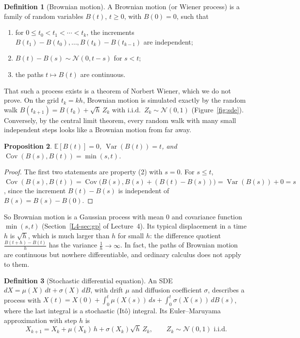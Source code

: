 \documentclass[11pt]{article}
\newcommand{\E}{\mathbb{E}}
\DeclareMathOperator{\Var}{Var}
\DeclareMathOperator{\Cov}{Cov}
\theoremstyle{definition}
\newtheorem{definition}{Definition}[section]
\theoremstyle{plain}
\newtheorem{proposition}[definition]{Proposition}
\theoremstyle{remark}
\begin{document}
\begin{definition}[Brownian motion]\label{def:brownian}
    A Brownian motion (or Wiener process) is a family of random variables $B(t)$, $t \geq 0$, with $B(0) = 0$, such that
    \begin{enumerate}
        \item for $0 \leq t_0 < t_1 < \cdots < t_k$, the increments $B(t_1) - B(t_0), \ldots, B(t_k) - B(t_{k-1})$ are independent;
        \item $B(t) - B(s) \sim \mathcal{N}(0, t - s)$ for $s < t$;
        \item the paths $t \mapsto B(t)$ are continuous.
    \end{enumerate}
\end{definition}

That such a process exists is a theorem of Norbert Wiener, which we do not prove. On the grid $t_k = kh$, Brownian motion is simulated exactly by the random walk $B(t_{k+1}) = B(t_k) + \sqrt{h}\,Z_k$ with i.i.d.\ $Z_k \sim \mathcal{N}(0, 1)$ (Figure~\ref{fig:sde}). Conversely, by the central limit theorem, every random walk with many small independent steps looks like a Brownian motion from far away.

\begin{proposition}\label{prop:brownian}
    $\E[B(t)] = 0$, $\Var(B(t)) = t$, and $\Cov(B(s), B(t)) = \min(s, t)$.
\end{proposition}

\begin{proof}
    The first two statements are property (2) with $s = 0$. For $s \leq t$, $\Cov(B(s), B(t)) = \Cov\big(B(s), B(s) + (B(t) - B(s))\big) = \Var(B(s)) + 0 = s$, since the increment $B(t) - B(s)$ is independent of $B(s) = B(s) - B(0)$.
\end{proof}

So Brownian motion is a Gaussian process with mean $0$ and covariance function $\min(s, t)$ (Section~\ref{L4-sec:gp} of Lecture~4). Its typical displacement in a time $h$ is $\sqrt{h}$, which is much larger than $h$ for small $h$: the difference quotient $\frac{B(t + h) - B(t)}{h}$ has the variance $\frac{1}{h} \to \infty$. In fact, the paths of Brownian motion are continuous but nowhere differentiable, and ordinary calculus does not apply to them.

\begin{definition}[Stochastic differential equation]\label{def:sde}
    An SDE $dX = \mu(X)\,dt + \sigma(X)\,dB$, with drift $\mu$ and diffusion coefficient $\sigma$, describes a process with $X(t) = X(0) + \int_0^t \mu(X(s))\, ds + \int_0^t \sigma(X(s))\, dB(s)$, where the last integral is a stochastic (It\^o) integral. Its Euler--Maruyama approximation with step $h$ is
    \[X_{k+1} = X_k + \mu(X_k)\,h + \sigma(X_k)\sqrt{h}\,Z_k, \qquad Z_k \sim \mathcal{N}(0, 1) \text{ i.i.d.}\]
\end{definition}
\end{document}
